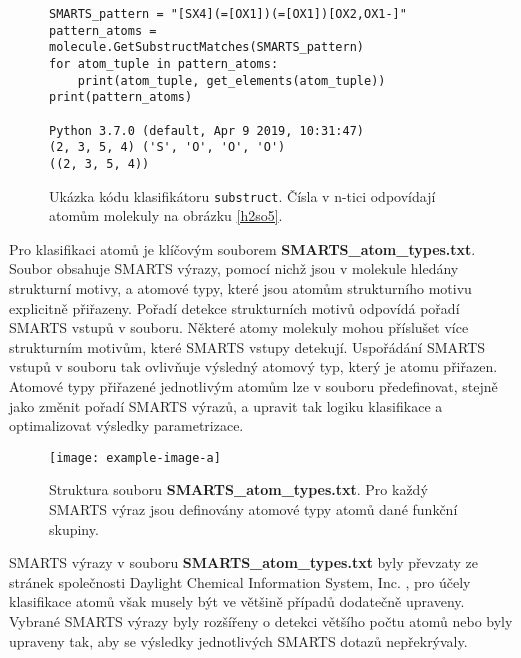 

\begin{figure}
\begin{lstlisting}
SMARTS_pattern = "[SX4](=[OX1])(=[OX1])[OX2,OX1-]"
pattern_atoms = molecule.GetSubstructMatches(SMARTS_pattern)
for atom_tuple in pattern_atoms:
    print(atom_tuple, get_elements(atom_tuple))
print(pattern_atoms)

Python 3.7.0 (default, Apr 9 2019, 10:31:47)
(2, 3, 5, 4) ('S', 'O', 'O', 'O')
((2, 3, 5, 4))
\end{lstlisting}
\caption{Ukázka kódu klasifikátoru \texttt{substruct}. Čísla v n-tici odpovídají atomům molekuly na obrázku \ref{h2so5}.}
\end{figure}

\bigskip
Pro klasifikaci atomů je klíčovým souborem \textbf{SMARTS\_atom\_types.txt}. Soubor obsahuje SMARTS výrazy, pomocí nichž jsou v molekule hledány strukturní motivy, a atomové typy, které jsou atomům strukturního motivu explicitně přiřazeny.
Pořadí detekce strukturních motivů odpovídá pořadí SMARTS vstupů v souboru. Některé atomy molekuly mohou příslušet více strukturním motivům, které SMARTS vstupy detekují. Uspořádání SMARTS vstupů v souboru tak ovlivňuje výsledný atomový typ, který je atomu přiřazen. Atomové typy přiřazené jednotlivým atomům lze v souboru předefinovat, stejně jako změnit pořadí SMARTS výrazů, a upravit tak logiku klasifikace a optimalizovat výsledky parametrizace.
\begin{figure}[h]
    \centering
    \texttt{[image: example-image-a]}
    \caption{Struktura souboru \textbf{SMARTS\_atom\_types.txt}. Pro každý SMARTS výraz jsou definovány atomové typy atomů dané funkční skupiny.}
    \label{SMARTS_file}
\end{figure}

SMARTS výrazy v souboru \textbf{SMARTS\_atom\_types.txt} byly převzaty ze stránek společnosti Daylight Chemical Information System, Inc. \cite{SMARTS_exm}, pro účely klasifikace atomů však musely být ve většině případů dodatečně upraveny. Vybrané SMARTS výrazy byly rozšířeny o detekci většího počtu atomů nebo byly upraveny tak, aby %
se výsledky jednotlivých SMARTS dotazů nepřekrývaly. 

